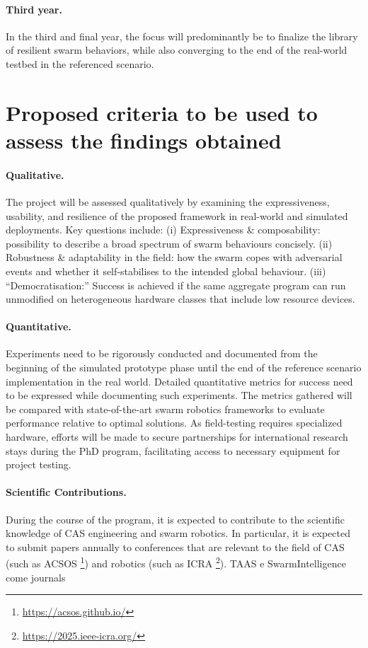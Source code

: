 \documentclass[12pt]{article}
\begin{document}
\paragraph{Third year.} In the third and final year, the focus will predominantly be to finalize the library of resilient swarm behaviors, while also converging to the end of the real-world testbed in the referenced scenario.

\section{Proposed criteria to be used to assess the findings obtained}

\paragraph{Qualitative.}
The project will be assessed qualitatively by examining the expressiveness, usability, and resilience of the proposed framework in real-world and simulated deployments.  
Key questions include:  
(i) Expressiveness \& composability: possibility to describe a broad spectrum of swarm behaviours concisely. 
(ii) Robustness \& adaptability in the field: how the swarm copes with adversarial events and whether it self‑stabilises to the intended global behaviour.  
(iii) “Democratisation:” Success is achieved if the same aggregate program can run unmodified on heterogeneous hardware classes that include low resource devices.


\paragraph{Quantitative.}
Experiments need to be rigorously conducted and documented from the beginning of the simulated prototype phase until the end of the reference scenario implementation in the real world.
Detailed quantitative metrics for success need to be expressed while documenting such experiments. 
The metrics gathered will be compared with state-of-the-art swarm robotics frameworks to evaluate performance relative to optimal solutions.
As field-testing requires specialized hardware, efforts will be made to secure partnerships for international research stays during the PhD program, facilitating access to necessary equipment for project testing.

\paragraph{Scientific Contributions.}
During the course of the program, it is expected to contribute to the scientific knowledge of CAS engineering and swarm robotics. 
In particular, it is expected to submit papers annually to conferences that are relevant to the field of CAS (such as ACSOS \footnote{\url{https://acsos.github.io/}}) and robotics (such as ICRA \footnote{\url{https://2025.ieee-icra.org/}}).
TAAS e SwarmIntelligence come journals 
\clearpage

\renewcommand{\refname}{References}



\end{document}
